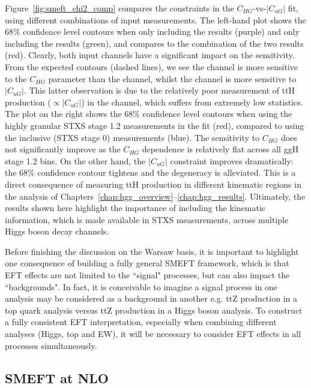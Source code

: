 Figure~\ref{fig:smeft_chi2_comp} compares the constraints in the $C_{HG}$-vs-$|C_{uG}|$ fit, using different combinations of input measurements. The left-hand plot shows the 68\% confidence level contours when only including the \Hgg results (purple) and only including the \Hfl results (green), and compares to the combination of the two results (red). Clearly, both input channels have a significant impact on the sensitivity. From the expected contours (dashed lines), we see the \Hfl channel is more sensitive to the $C_{HG}$ parameter than the \Hgg channel, whilst the \Hgg channel is more sensitive to $|C_{uG}|$. This latter observation is due to the relatively poor measurement of ttH production ($\propto|C_{uG}|$) in the \Hfl channel, which suffers from extremely low statistics. The plot on the right shows the 68\% confidence level contours when using the highly granular STXS stage 1.2 measurements in the fit (red), compared to using the inclusive (STXS stage 0) measurements (blue). The sensitivity to $C_{HG}$ does not significantly improve as the $C_{HG}$ dependence is relatively flat across all ggH stage 1.2 bins. On the other hand, the $|C_{uG}|$ constraint improves dramatically: the 68\% confidence contour tightens and the degeneracy is alleviated. This is a direct consequence of measuring ttH production in different kinematic regions in the \Hgg analysis of Chapters~\ref{chap:hgg_overview}--\ref{chap:hgg_results}. Ultimately, the results shown here highlight the importance of including the kinematic information, which is made available in STXS measurements, across multiple Higgs boson decay channels.

Before finishing the discussion on the Warsaw basis, it is important to highlight one consequence of building a fully general SMEFT framework, which is that EFT effects are not limited to the ``signal" processes, but can also impact the ``backgrounds". In fact, it is conceivable to imagine a signal process in one analysis may be considered as a background in another e.g. ttZ production in a top quark analysis versus ttZ production in a Higgs boson analysis. To construct a fully consistent EFT interpretation, especially when combining different analyses (Higgs, top and EW), it will be necessary to consider EFT effects in all processes simultaneously.


\subsection{SMEFT at NLO}



